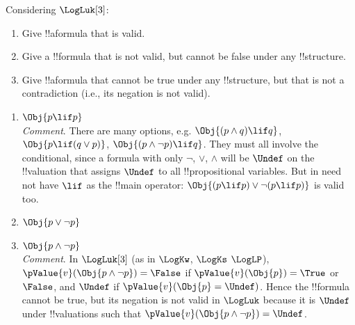 \documentclass[../../../../include/open-logic-section]{subfiles}
\begin{document}
\begin{prob}
Considering $\LogLuk[3]$:
\begin{enumerate}
\item Give !!a{formula} that is valid.
\item Give a !!{formula} that is not valid, but cannot be false under
any  !!{structure}.
\item Give !!a{formula} that cannot be true under any !!{structure}, but 
that is not a contradiction (i.e., its negation is not valid).
\end{enumerate}
\begin{ans}
\begin{enumerate}
\item $\Obj{p \lif p}$\\
	\emph{Comment}. There are many options, e.g.  $\Obj{(p \land q) \lif
	q}$, $\Obj{p \lif (q \lor p)}$,  $\Obj{(p \land \lnot p) \lif q}$. They
	must all involve the conditional, since a formula with only $\lnot$,
	$\lor$, $\land$ will be $\Undef$ on the !!{valuation} that assigns
	$\Undef$ to all !!{propositional variable}s. But in need not have
	$\lif$ as the !!{main operator}: $\Obj{(p\lif p)\lor \lnot(p\lif p)}$
	is valid too.  
\item $\Obj{p \lor \lnot p}$
\item $\Obj{p \land \lnot p}$\\
	\emph{Comment}. In $\LogLuk[3]$ (as in $\LogKw$, $\LogKs$
	$\LogLP$), $\pValue{v}(\Obj{p \land \lnot p}) = \False$ if 
	$\pValue{v}(\Obj{p})=\True$ or $\False$, and $\Undef$ if 
	$\pValue{v}(\Obj{p}=\Undef)$. Hence the !!{formula} cannot be
	true, but its negation is not valid in $\LogLuk$ because it is
	$\Undef$ under !!{valuation}s such that $\pValue{v}(\Obj{p \land 
	\lnot p}) = \Undef$.
\end{enumerate}
\end{ans}
\end{prob}
\end{document}
